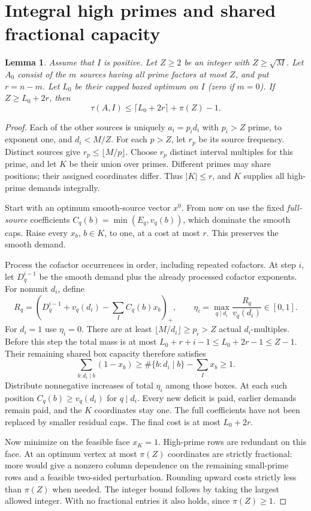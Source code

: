\documentclass[11pt,a4paper]{article}
\newtheorem{lemma}[theorem]{Lemma}
\begin{document}
\section{Integral high primes and shared fractional capacity}
\begin{lemma}\label{lem:extension}
Assume that $I$ is positive. Let $Z\ge2$ be an integer with $Z\ge\sqrt M$. Let $A_0$ consist of the
$m$ sources having all prime factors at most $Z$, and put $r=n-m$.
Let $L_0$ be their capped boxed optimum on $I$ (zero if $m=0$).
If $Z\ge L_0+2r$, then
\[
 \tau(A,I)\le\lceil L_0+2r\rceil+\pi(Z)-1.
\]
\end{lemma}
\begin{proof}
Each of the other sources is uniquely $a_i=p_id_i$ with $p_i>Z$ prime,
to exponent one, and $d_i<M/Z$. For each $p>Z$, let $r_p$ be its
source frequency. Distinct sources give $r_p\le\lfloor M/p\rfloor$.
Choose $r_p$ distinct interval multiples for this prime, and let $K$ be
their union over primes. Different primes may share positions; their
assigned coordinates differ. Thus $|K|\le r$, and $K$ supplies all
high-prime demands integrally.

Start with an optimum smooth-source vector $x^0$. From now on use the
fixed \emph{full-source} coefficients $C_q(b)=\min(E_q,v_q(b))$,
which dominate the smooth caps. Raise every $x_b$, $b\in K$, to one,
at a cost at most $r$. This preserves the smooth demand.

Process the cofactor occurrences in order, including repeated cofactors.
At step $i$, let $D_q^{i-1}$ be the smooth demand plus the already
processed cofactor exponents. For nonunit $d_i$, define
\[
 R_q=\left(D_q^{i-1}+v_q(d_i)-\sum_IC_q(b)x_b\right)_+,\qquad
 \eta_i=\max_{q\mid d_i}\frac{R_q}{v_q(d_i)}\in[0,1].
\]
For $d_i=1$ use $\eta_i=0$. There are at least
$\lfloor M/d_i\rfloor\ge p_i>Z$ actual $d_i$-multiples.
Before this step the total mass is at most
$L_0+r+i-1\le L_0+2r-1\le Z-1$.
Their remaining shared box capacity therefore satisfies
\[
 \sum_{b:d_i\mid b}(1-x_b)
 \ge \#\{b:d_i\mid b\}-\sum_Ix_b\ge1.
\]
Distribute nonnegative increases of total $\eta_i$ among those boxes.
At each such position $C_q(b)\ge v_q(d_i)$ for $q\mid d_i$.
Every new deficit is paid, earlier demands remain paid, and the $K$
coordinates stay one. The full coefficients have not been replaced
by smaller residual caps. The final cost is at most $L_0+2r$.

Now minimize on the feasible face $x_K=1$. High-prime rows are redundant
on this face. At an optimum vertex at most $\pi(Z)$ coordinates are
strictly fractional: more would give a nonzero column dependence on
the remaining small-prime rows and a feasible two-sided perturbation.
Rounding upward costs strictly less than $\pi(Z)$ when needed.
The integer bound follows by taking the largest allowed integer.
With no fractional entries it also holds, since $\pi(Z)\ge1$.
\end{proof}
\end{document}
